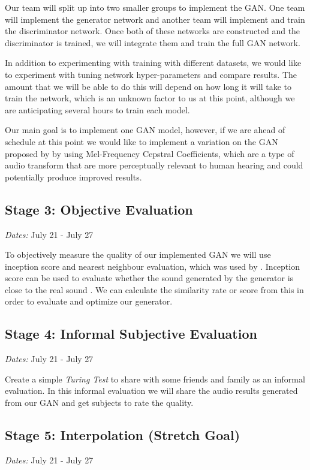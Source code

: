 \documentclass{article} %
\begin{document}
Our team will split up into two smaller groups to implement the GAN. One team will implement the generator network and another team will implement and train the discriminator network. Once both of these networks are constructed and the discriminator is trained, we will integrate them and train the full GAN network.
 
In addition to experimenting with training with different datasets, we would like to experiment with tuning network hyper-parameters and compare results. The amount that we will be able to do this will depend on how long it will take to train the network, which is an unknown factor to us at this point, although we are anticipating several hours to train each model.

Our main goal is to implement one GAN model, however, if we are ahead of schedule at this point we would like to implement a variation on the GAN proposed by \citep{donahue2018adversarial} by using Mel-Frequency Cepstral Coefficients, which are a type of audio transform that are more perceptually relevant to human hearing and could potentially produce improved results.
\subsection{Stage 3: Objective Evaluation}
\emph{Dates:} July 21 - July 27

To objectively measure the quality of our implemented GAN we will use inception score and nearest neighbour evaluation, which was used by \citet{donahue2018adversarial}. Inception score can be used to evaluate whether the sound generated by the generator is close to the real sound \citep{xu2018empirical}. We can calculate the similarity rate or score from this in order to evaluate and optimize our generator.

\subsection{Stage 4: Informal Subjective Evaluation}
\emph{Dates:} July 21 - July 27

Create a simple \emph{Turing Test} to share with some friends and family as an informal evaluation. In this informal evaluation we will share the audio results generated from our GAN and get subjects to rate the quality.

\subsection{Stage 5: Interpolation (Stretch Goal)}
\emph{Dates:} July 21 - July 27
\end{document}
